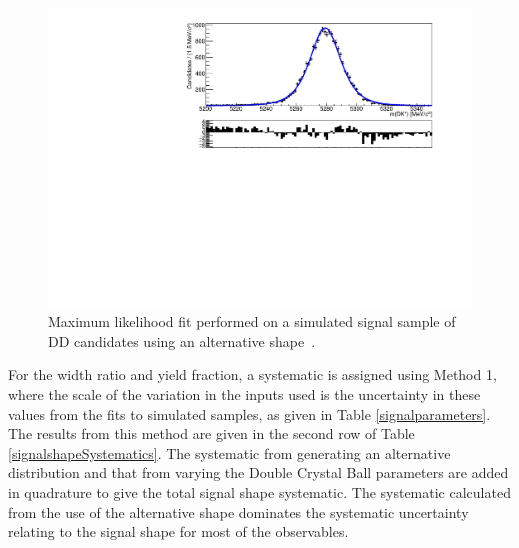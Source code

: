 \begin{figure}[h]
\centering
\includegraphics[width=0.7\linewidth]{figures/fitComponents/signalShape_DD_KPi_Johnson.pdf}
\caption{Maximum likelihood fit performed on a simulated signal sample of DD candidates using an alternative shape~\cite{doublejohnson}.}
\label{signalshapesys}
\end{figure}

For the width ratio and yield fraction, a systematic is assigned using Method 1, where the scale of the variation in the inputs used is the uncertainty in these values from the fits to simulated samples, as given in Table \ref{signalparameters}. The results from this method are given in the second row of Table \ref{signalshapeSystematics}. The systematic from generating an alternative distribution and that from varying the Double Crystal Ball parameters are added in quadrature to give the total signal shape systematic. The systematic calculated from the use of the alternative shape dominates the systematic uncertainty relating to the signal shape for most of the \CP observables.

